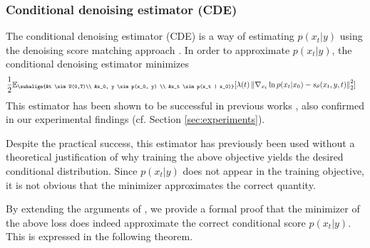 \subsubsection{Conditional denoising estimator (CDE)}
The conditional denoising estimator (CDE) is a way of estimating $p(x_t|y)$ using the denoising score matching approach \cite{vincent2011connection, song2020generative_score}. In order to approximate $p(x_t|y)$, the conditional denoising estimator minimizes
\begin{gather}
\begin{aligned}
        \label{CDN}
        &\frac{1}{2} \mathbb{E}_{\subalign{&t \sim U(0,T)\\ &x_0, y \sim p(x_0, y) \\ &x_t \sim p(x_t | x_0)}} 
        [\lambda(t) \norm{\nabla_{x_t} \ln{p(x_t | x_0)} - s_\theta(x_t, y, t)}_2^2]
\end{aligned}
\end{gather}
This estimator has been shown to be successful in previous works \cite{saharia2021sr3,tashiro2021csdi}, also confirmed in our experimental findings (cf. Section \ref{sec:experiments}). 

Despite the practical success, this estimator has previously been used without a theoretical justification of why training the above objective yields the desired conditional distribution. Since $p(x_t|y)$ does not appear in the training objective, it is not obvious that the minimizer approximates the correct quantity. 

By extending the arguments of \cite{vincent2011connection}, we provide a formal proof that the minimizer of the above loss does indeed approximate the correct conditional score $p(x_t|y)$. This is expressed in the following theorem.

